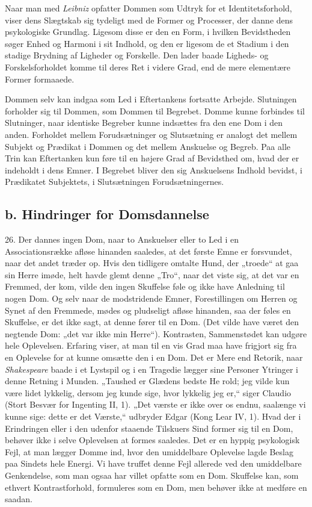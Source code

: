 \documentclass[12pt,a4paper]{book}
\newcommand{\opage}[1]{\marginnote{\footnotesize\textit{[#1]}}}
\newcommand{\apage}[1]{\marginnote{\footnotesize\textit{[#1]}}}
\begin{document}
Naar man med \emph{Leibniz} opfatter Dommen som Udtryk for et
Identitetsforhold, viser dens Slægtskab sig tydeligt med de Former og
Processer, der danne dens psykologiske Grundlag. \apage{74} Ligesom disse er den en
Form, i hvilken Bevidstheden søger Enhed og Harmoni i sit Indhold, og
den er ligesom de et Stadium i den stadige Brydning af Ligheder og
Forskelle. Den lader baade Ligheds- og Forskelsforholdet komme til deres
Ret i videre Grad, end de mere elementære Former formaaede.

Dommen selv kan indgaa som Led i Eftertankens fortsatte Arbejde.
Slutningen forholder sig til Dommen, som Dommen til Begrebet. Domme
kunne forbindes til Slutninger, naar identiske Begreber kunne indsættes
fra den ene Dom i den anden. Forholdet mellem Forudsætninger og
Slutsætning er analogt det mellem Subjekt og Prædikat i Dommen og det
mellem Anskuelse og Begreb. Paa alle Trin kan Eftertanken kun føre til
en højere Grad af Bevidsthed om, hvad der er indeholdt i dens Emner. I
Begrebet bliver den sig Anskuelsens Indhold bevidst, i Prædikatet
Subjektets, i Slutsætningen Forudsætningernes.

\subsection*{b. Hindringer for Domsdannelse}
\label{ssec:hindringer}

26. Der dannes ingen Dom, naar to Anskuelser eller to Led i en
Associationsrække afløse hinanden saaledes, at det første Emne er
forsvundet, naar det andet træder op. Hvis den tidligere omtalte Hund,
der „troede“ at gaa sin Herre imøde, helt havde glemt denne „Tro“, naar
det viste sig, at det var en Fremmed, der kom, vilde den ingen Skuffelse
føle og ikke have Anledning til nogen Dom. Og selv naar de modstridende
Emner, Forestillingen om Herren og Synet af den Fremmede, mødes og
pludseligt afløse hinanden, saa der føles en Skuffelse, er det ikke
sagt, at denne fører til en Dom. (Det vilde have været den negtende Dom:
„det var ikke min Herre“). Kontrasten, Sammenstødet kan udgøre hele
Oplevelsen. Erfaring viser, at man til en vis Grad maa have frigjort sig
fra en Oplevelse for at kunne omsætte den i en Dom. Det er Mere end
Retorik, naar \emph{Shakespeare} baade i et Lystspil og i en Tragedie
lægger sine Personer Ytringer i denne Retning i Munden. „Taushed er
Glædens bedste He%
\opage{75}rold; jeg vilde kun være lidet lykkelig, dersom jeg
kunde sige, hvor lykkelig jeg er,“ siger Claudio (Stort Besvær for
Ingenting II, 1). „Det værste er ikke over os endnu, saalænge vi kunne
sige: dette er det Værste,“ udbryder Edgar (Kong Lear IV, 1). Hvad der i
Erindringen eller i den udenfor staaende Tilskuers Sind former sig til
en Dom, behøver ikke i selve Oplevelsen at formes saaledes. Det er en
hyppig psykologisk Fejl, at man lægger Domme ind, hvor den umiddelbare
Oplevelse lagde Beslag paa Sindets hele Energi. Vi have truffet denne
Fejl allerede ved den umiddelbare Genkendelse, som man ogsaa har villet
opfatte som en Dom. Skuffelse kan, som ethvert Kontrastforhold,
formuleres som en Dom, men behøver ikke at medføre en saadan.
\end{document}
